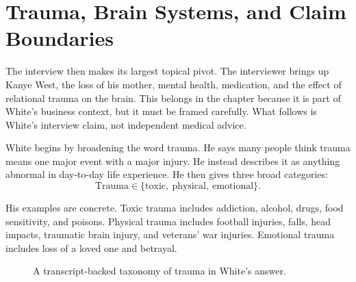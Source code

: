 \section{Trauma, Brain Systems, and Claim Boundaries}

The interview then makes its largest topical pivot. The interviewer brings up Kanye West, the loss of his mother, mental health, medication, and the effect of relational trauma on the brain. This belongs in the chapter because it is part of White's business context, but it must be framed carefully. What follows is White's interview claim, not independent medical advice.

White begins by broadening the word trauma. He says many people think trauma means one major event with a major injury. He instead describes it as anything abnormal in day-to-day life experience. He then gives three broad categories:
\begin{equation}
\text{Trauma}\in
\{\text{toxic},\ \text{physical},\ \text{emotional}\}.
\end{equation}

His examples are concrete. Toxic trauma includes addiction, alcohol, drugs, food sensitivity, and poisons. Physical trauma includes football injuries, falls, head impacts, traumatic brain injury, and veterans' war injuries. Emotional trauma includes loss of a loved one and betrayal.

\begin{figure}
\centering
{}
\caption{A transcript-backed taxonomy of trauma in White's answer.}
\end{figure}

